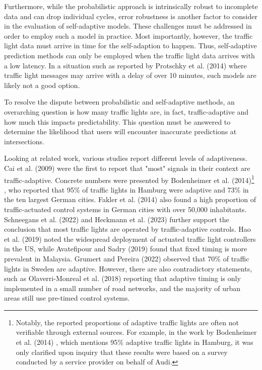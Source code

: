 Furthermore, while the probabilistic approach is intrinsically robust to incomplete data and can drop individual cycles, error robustness is another factor to consider in the evaluation of self-adaptive models. These challenges must be addressed in order to employ such a model in practice. Most importantly, however, the traffic light data must arrive in time for the self-adaption to happen. Thus, self-adaptive prediction methods can only be employed when the traffic light data arrives with a low latency. In a situation such as reported by Protschky et al. (2014) \cite{protschky_extensive_2014, protschky_adaptive_2014} where traffic light messages may arrive with a delay of over 10 minutes, such models are likely not a good option.

To resolve the dispute between probabilistic and self-adaptive methods, an overarching question is how many traffic lights are, in fact, traffic-adaptive and how much this impacts predictability. This question must be answered to determine the likelihood that users will encounter inaccurate predictions at intersections. 

Looking at related work, various studies report different levels of adaptiveness. Cai et al. (2009) \cite{cai_adaptive_2009} were the first to report that "most" signals in their context are traffic-adaptive. Concrete numbers were presented by Bodenheimer et al. (2014)\footnote{Notably, the reported proportions of adaptive traffic lights are often not verifiable through external sources. For example, in the work by Bodenheimer et al. (2014) \cite{bodenheimer_enabling_2014}, which mentions 95\% adaptive traffic lights in Hamburg, it was only clarified upon inquiry that these results were based on a survey conducted by a service provider on behalf of Audi.} \cite{bodenheimer_enabling_2014}, who reported that 95\% of traffic lights in Hamburg were adaptive and 73\% in the ten largest German cities. Fakler et al. (2014) \cite{fakler_structures_2014} also found a high proportion of traffic-actuated control systems in German cities with over 50,000 inhabitants. Schneegans et al. (2022) \cite{scheegans_exploiting_2022} and Heckmann et al. (2023) \cite{heckmann_stage_2023} further support the conclusion that most traffic lights are operated by traffic-adaptive controls. Hao et al. (2019) \cite{hao_eco-approach_2019} noted the widespread deployment of actuated traffic light controllers in the US, while Avatefipour and Sadry (2019) \cite{avatefipour_traffic_2018} found that fixed timing is more prevalent in Malaysia. Grumert and Pereira (2022) \cite{grumert_heads-up_2022} observed that 70\% of traffic lights in Sweden are adaptive. However, there are also contradictory statements, such as Olaverri-Monreal et al. (2018) \cite{olaverri-monreal_implementation_2018} reporting that adaptive timing is only implemented in a small number of road networks, and the majority of urban areas still use pre-timed control systems.


